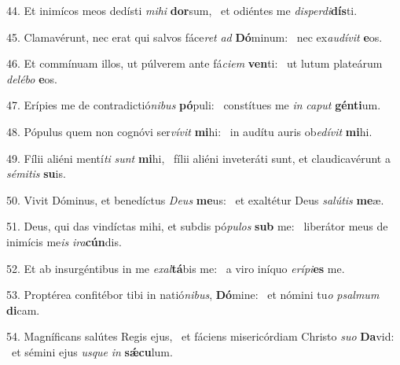 44. Et inimícos meos dedísti \textit{mi}\textit{hi} \textbf{dor}sum, \ast\  et odiéntes me \textit{dis}\textit{per}\textit{di}\textbf{dís}ti.\

45. Clamavérunt, nec erat qui salvos fáce\textit{ret} \textit{ad} \textbf{Dó}minum: \ast\  nec ex\textit{au}\textit{dí}\textit{vit} \textbf{e}os.\

46. Et commínuam illos, ut púlverem ante fá\textit{ci}\textit{em} \textbf{ven}ti: \ast\  ut lutum plateárum \textit{de}\textit{lé}\textit{bo} \textbf{e}os.\

47. Erípies me de contradictió\textit{ni}\textit{bus} \textbf{pó}puli: \ast\  constítues me \textit{in} \textit{ca}\textit{put} \textbf{gén}\textbf{ti}um.\

48. Pópulus quem non cognóvi ser\textit{ví}\textit{vit} \textbf{mi}hi: \ast\  in audítu auris ob\textit{e}\textit{dí}\textit{vit} \textbf{mi}hi.\

49. Fílii aliéni mentí\textit{ti} \textit{sunt} \textbf{mi}hi, \ast\  fílii aliéni inveteráti sunt, et claudicavérunt a \textit{sé}\textit{mi}\textit{tis} \textbf{su}is.\

50. Vivit Dóminus, et benedíctus \textit{De}\textit{us} \textbf{me}us: \ast\  et exaltétur Deus \textit{sa}\textit{lú}\textit{tis} \textbf{me}æ.\

51. Deus, qui das vindíctas mihi, et subdis pó\textit{pu}\textit{los} \textbf{sub} me: \ast\  liberátor meus de inimícis me\textit{is} \textit{i}\textit{ra}\textbf{cún}dis.\

52. Et ab insurgéntibus in me \textit{ex}\textit{al}\textbf{tá}bis me: \ast\  a viro iníquo \textit{e}\textit{rí}\textit{pi}\textbf{es} me.\

53. Proptérea confitébor tibi in natió\textit{ni}\textit{bus}, \textbf{Dó}mine: \ast\  et nómini tu\textit{o} \textit{psal}\textit{mum} \textbf{di}cam.\

54. Magníficans salútes Regis ejus, \dag\  et fáciens misericórdiam Christo \textit{su}\textit{o} \textbf{Da}vid: \ast\  et sémini ejus \textit{us}\textit{que} \textit{in} \textbf{sǽ}\textbf{cu}lum.\

